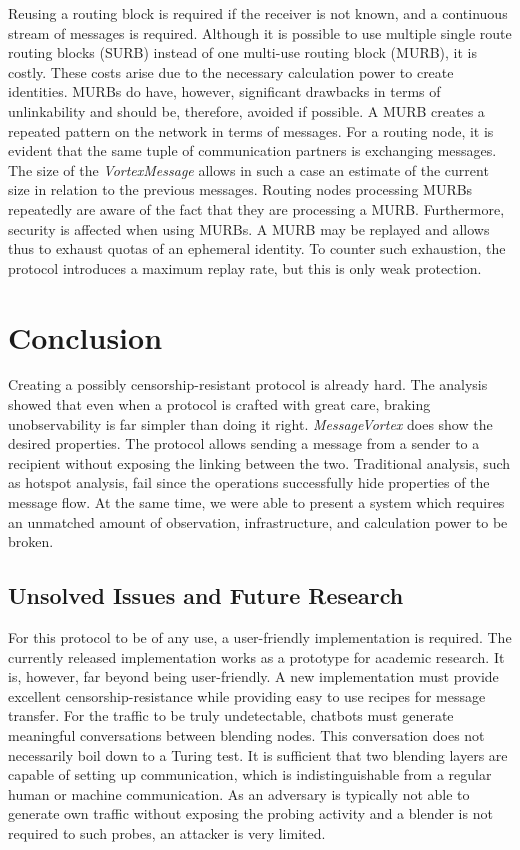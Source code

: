 \documentclass[acmsmall, screen, review]{acmart}
\begin{document}
Reusing a routing block is required if the receiver is not known, and a continuous stream of messages is required. Although it is possible to use multiple single route routing blocks (SURB) instead of one multi-use routing block (MURB), it is costly. These costs arise due to the necessary calculation power to create identities. MURBs do have, however, significant drawbacks in terms of unlinkability and should be, therefore, avoided if possible. A MURB creates a repeated pattern on the network in terms of messages. For a routing node, it is evident that the same tuple of communication partners is exchanging messages. The size of the \emph{VortexMessage} allows in such a case an estimate of the current size in relation to the previous messages. Routing nodes processing MURBs repeatedly are aware of the fact that they are processing a MURB. Furthermore, security is affected when using MURBs. A MURB may be replayed and allows thus to exhaust quotas of an ephemeral identity. To counter such exhaustion, the protocol introduces a maximum replay rate, but this is only weak protection.

\section{Conclusion}
Creating a possibly censorship-resistant protocol is already hard. The analysis showed that even when a protocol is crafted with great care, braking unobservability is far simpler than doing it right. \emph{MessageVortex} does show the desired properties. The protocol allows sending a message from a sender to a recipient without exposing the linking between the two. Traditional analysis, such as hotspot analysis, fail since the operations successfully hide properties of the message flow. At the same time, we were able to present a system which requires an unmatched amount of observation, infrastructure, and calculation power to be broken.

\subsection{Unsolved Issues and Future Research}
For this protocol to be of any use, a user-friendly implementation is required. The currently released implementation works as a prototype for academic research. It is, however, far beyond being user-friendly. A new implementation must provide excellent censorship-resistance while providing easy to use recipes for message transfer.  For the traffic to be truly undetectable, chatbots must generate meaningful conversations between blending nodes. This conversation does not necessarily boil down to a Turing test. It is sufficient that two blending layers are capable of setting up communication, which is indistinguishable from a regular human or machine communication. As an adversary is typically not able to generate own traffic without exposing the probing activity and a blender is not required to such probes, an attacker is very limited. 
\end{document}
